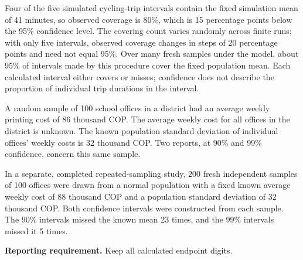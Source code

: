 Four of the five simulated cycling-trip intervals contain the fixed simulation mean of 41 minutes, so observed coverage is 80\%, which is 15 percentage points below the 95\% confidence level. The covering count varies randomly across finite runs; with only five intervals, observed coverage changes in steps of 20 percentage points and need not equal 95\%. Over many fresh samples under the model, about 95\% of intervals made by this procedure cover the fixed population mean. Each calculated interval either covers or misses; confidence does not describe the proportion of individual trip durations in the interval.


\vspace{-6mm}
A random sample of 100 school offices in a district had an average weekly printing cost of 86 thousand COP. The average weekly cost for all offices in the district is unknown. The known population standard deviation of individual offices' weekly costs is 32 thousand COP. Two reports, at 90\% and 99\% confidence, concern this same sample.

In a separate, completed repeated-sampling study, 200 fresh independent samples of 100 offices were drawn from a normal population with a fixed known average weekly cost of 88 thousand COP and a population standard deviation of 32 thousand COP. Both confidence intervals were constructed from each sample. The 90\% intervals missed the known mean 23 times, and the 99\% intervals missed it 5 times.

\textbf{Reporting requirement.} Keep all calculated endpoint digits.


